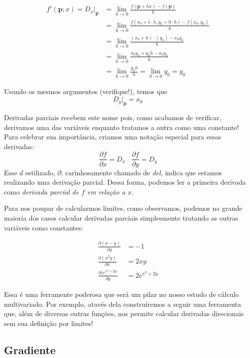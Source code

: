 \documentclass[
  letterpaper,
  DIV=11,
  numbers=noendperiod]{scrreprt}
\begin{document}
\[
\begin{aligned}
  f'(\pmb{p}; x) = D_{x}\rvert_{\pmb{p}} 
  &= \lim_{h \rightarrow 0} \frac{f(\pmb{p} + hx) - f(\pmb{p})}{h} \\
  &= \lim_{h\rightarrow 0} \frac{f(x_0 + 1 \cdot h, y_0 + 0 \cdot h) - f(x_0,y_0)}{h} \\
  &= \lim_{h\rightarrow 0} \frac{(x_0+h)\cdot(y_0) - x_{0}y_0}{h} \\
  &= \lim_{h\rightarrow 0} \frac{x_0y_0 + y_0h - x_0y_0}{h} \\
  &= \lim_{h\rightarrow 0} \frac{y_0h}{h} = \lim_{h\rightarrow 0} y_0  = y_0
\end{aligned}
\]

Usando os mesmos argumentos (verifique!), temos que \[
D_{y}\rvert_{\pmb{p}} = x_0
\]

Derivadas parciais recebem este nome pois, como acabamos de verificar,
derivamos uma das variáveis enquanto tratamos a outra como uma
constante! Para celebrar sua importância, criamos uma notação especial
para essas derivadas: \[
\frac{\partial f}{\partial x} = D_x ~~~~ \frac{\partial f}{\partial y} = D_y
\] Esse \(d\) estilizado, \(\partial\), carinhosamente chamado de
\emph{del}, indica que estamos realizando uma derivação parcial. Dessa
forma, podemos ler a primeira derivada como \emph{derivada parcial de
\(f\) em relação a \(x\)}.

Para nos poupar de calcularmos limites, como observamos, podemos na
grande maioria dos casos calcular derivadas parciais simplesmente
tratando as outras variáveis como constantes:

\[
\begin{aligned}
\frac{\partial (x - y)}{\partial y} &= -1 \\
\frac{\partial (x^2y)}{\partial x } &= 2xy \\
\frac{\partial (e^{x^3+2y)}}{\partial y} &= 2 e^{x^3 + 2y} 
\end{aligned}
\]

Essa é uma ferramente poderosa que será um pilar no nosso estudo de
cálculo multivariado. Por exemplo, atavés dela construíremos a seguir
uma ferramenta que, além de diversas outras funções, nos permite
calcular derivadas direcionais sem sua definição por limites!

\section{Gradiente}\label{gradiente}

\chapter{}\label{section-1}
\end{document}
